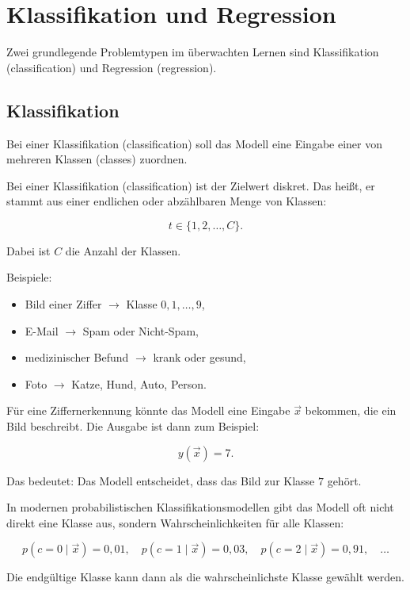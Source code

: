 \section{Klassifikation und Regression}

Zwei grundlegende Problemtypen im überwachten Lernen sind Klassifikation (classification) und Regression (regression).

\subsection{Klassifikation}

Bei einer Klassifikation (classification) soll das Modell eine Eingabe einer von mehreren Klassen (classes) zuordnen.

\begin{definitionbox}
Bei einer Klassifikation (classification) ist der Zielwert diskret.
Das heißt, er stammt aus einer endlichen oder abzählbaren Menge von Klassen:

\[
    t \in \{1,2,\dots,C\}.
\]

Dabei ist \(C\) die Anzahl der Klassen.
\end{definitionbox}

Beispiele:

\begin{itemize}
    \item Bild einer Ziffer \(\rightarrow\) Klasse \(0,1,\dots,9\),
    \item E-Mail \(\rightarrow\) Spam oder Nicht-Spam,
    \item medizinischer Befund \(\rightarrow\) krank oder gesund,
    \item Foto \(\rightarrow\) Katze, Hund, Auto, Person.
\end{itemize}

Für eine Ziffernerkennung könnte das Modell eine Eingabe \(\vec{x}\) bekommen, die ein Bild beschreibt.
Die Ausgabe ist dann zum Beispiel:

\[
    y(\vec{x}) = 7.
\]

Das bedeutet:
Das Modell entscheidet, dass das Bild zur Klasse \(7\) gehört.

\begin{notebox}
In modernen probabilistischen Klassifikationsmodellen gibt das Modell oft nicht direkt eine Klasse aus, sondern Wahrscheinlichkeiten für alle Klassen:

\[
    p(c=0 \mid \vec{x}) = 0{,}01,
    \quad
    p(c=1 \mid \vec{x}) = 0{,}03,
    \quad
    p(c=2 \mid \vec{x}) = 0{,}91,
    \quad
    \dots
\]

Die endgültige Klasse kann dann als die wahrscheinlichste Klasse gewählt werden.
\end{notebox}

